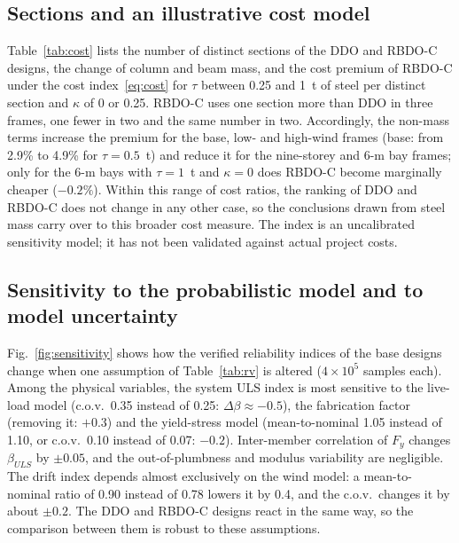\subsection{Sections and an illustrative cost model}\label{sec:cost}

Table~\ref{tab:cost} lists the number of distinct sections of the DDO and RBDO-C designs, the
change of column and beam mass, and the cost premium of RBDO-C under the cost
index~\eqref{eq:cost} for $\tau$ between 0.25 and 1~t of steel per distinct section and $\kappa$ of
0 or 0.25. RBDO-C uses one section more than DDO in three frames, one fewer in two and the same
number in two. Accordingly, the non-mass terms increase the premium for the base, low- and
high-wind frames (base: from 2.9\% to 4.9\% for $\tau=0.5$~t) and reduce it for the nine-storey and
6-m bay frames; only for the 6-m bays with $\tau=1$~t and $\kappa=0$ does RBDO-C become marginally
cheaper ($-0.2\%$). Within this range of cost ratios, the ranking of DDO and RBDO-C does not change
in any other case, so the conclusions drawn from steel mass carry over to this broader cost measure. The index is an
uncalibrated sensitivity model; it has not been validated against actual project costs.

\begin{table}[!htbp]
\centering
\caption{Distinct sections, change of column and beam mass, and cost premium of RBDO-C over DDO
under the illustrative cost index $C = m + \tau n_{sec} + \kappa m_{beam}$ ($\tau$ in tonnes of steel
per distinct section).}
\label{tab:cost}
\scriptsize
\fittable{}
\end{table}

\subsection{Sensitivity to the probabilistic model and to model uncertainty}\label{sec:sensitivity}

Fig.~\ref{fig:sensitivity} shows how the verified reliability indices of the base designs change
when one assumption of Table~\ref{tab:rv} is altered ($4\times10^5$ samples each). Among the
physical variables, the system ULS index is most sensitive to the live-load model (c.o.v.\ 0.35
instead of 0.25: $\Delta\beta\approx-0.5$), the fabrication factor (removing it: $+0.3$) and the
yield-stress model (mean-to-nominal 1.05 instead of 1.10, or c.o.v.\ 0.10 instead of 0.07: $-0.2$).
Inter-member correlation of $F_y$ changes $\beta_{ULS}$ by $\pm0.05$, and the out-of-plumbness and
modulus variability are negligible. The drift index depends almost exclusively on the wind model:
a mean-to-nominal ratio of 0.90 instead of 0.78 lowers it by 0.4, and the c.o.v.\ changes it by
about $\pm0.2$. The DDO and RBDO-C designs react in the same way, so the comparison between them is
robust to these assumptions.

